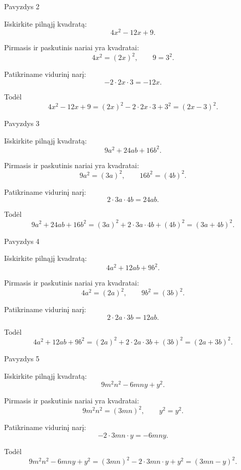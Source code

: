 \documentclass[aspectratio=169,11pt]{beamer}
\begin{document}
\begin{frame}{Pavyzdys 2}

Išskirkite pilnąjį kvadratą:
\[
4x^2-12x+9.
\]

\pause

Pirmasis ir paskutinis nariai yra kvadratai:
\[
4x^2=(2x)^2,
\qquad
9=3^2.
\]

\pause

Patikriname vidurinį narį:
\[
-2\cdot2x\cdot3=-12x.
\]

\pause

Todėl
\[
4x^2-12x+9
=(2x)^2-2\cdot2x\cdot3+3^2
=(2x-3)^2.
\]

\end{frame}

\begin{frame}{Pavyzdys 3}

Išskirkite pilnąjį kvadratą:
\[
9a^2+24ab+16b^2.
\]

\pause

Pirmasis ir paskutinis nariai yra kvadratai:
\[
9a^2=(3a)^2,
\qquad
16b^2=(4b)^2.
\]

\pause

Patikriname vidurinį narį:
\[
2\cdot3a\cdot4b=24ab.
\]

\pause

Todėl
\[
9a^2+24ab+16b^2
=(3a)^2+2\cdot3a\cdot4b+(4b)^2
=(3a+4b)^2.
\]

\end{frame}

\begin{frame}{Pavyzdys 4}

Išskirkite pilnąjį kvadratą:
\[
4a^2+12ab+9b^2.
\]

\pause

Pirmasis ir paskutinis nariai yra kvadratai:
\[
4a^2=(2a)^2,
\qquad
9b^2=(3b)^2.
\]

\pause

Patikriname vidurinį narį:
\[
2\cdot2a\cdot3b=12ab.
\]

\pause

Todėl
\[
4a^2+12ab+9b^2
=(2a)^2+2\cdot2a\cdot3b+(3b)^2
=(2a+3b)^2.
\]

\end{frame}

\begin{frame}{Pavyzdys 5}

Išskirkite pilnąjį kvadratą:
\[
9m^2n^2-6mny+y^2.
\]

\pause

Pirmasis ir paskutinis nariai yra kvadratai:
\[
9m^2n^2=(3mn)^2,
\qquad
y^2=y^2.
\]

\pause

Patikriname vidurinį narį:
\[
-2\cdot3mn\cdot y=-6mny.
\]

\pause

Todėl
\[
9m^2n^2-6mny+y^2
=(3mn)^2-2\cdot3mn\cdot y+y^2
=(3mn-y)^2.
\]

\end{frame}
\end{document}
